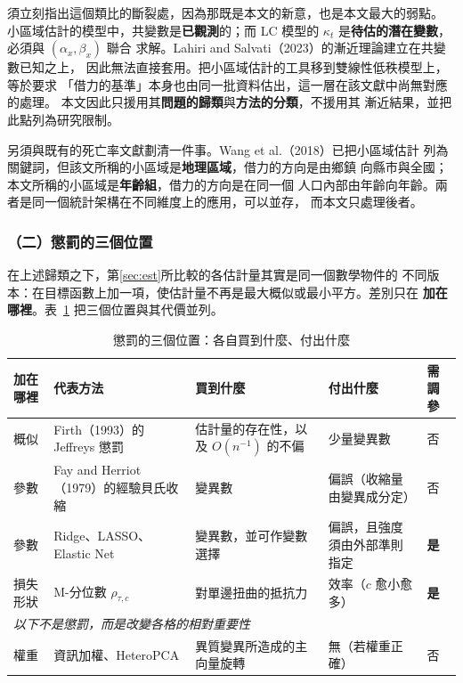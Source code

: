 \documentclass[UTF8, fontset=macnew, a4paper, 12pt]{ctexart}
\begin{document}
須立刻指出這個類比的斷裂處，因為那既是本文的新意，也是本文最大的弱點。
小區域估計的模型中，共變數是\textbf{已觀測}的；而 LC 模型的
$\kappa_t$ 是\textbf{待估的潛在變數}，必須與 $(\alpha_x,\beta_x)$ 聯合
求解。Lahiri and Salvati（2023）的漸近理論建立在共變數已知之上，
因此無法直接套用。把小區域估計的工具移到雙線性低秩模型上，等於要求
「借力的基準」本身也由同一批資料估出，這一層在該文獻中尚無對應的處理。
本文因此只援用其\textbf{問題的歸類}與\textbf{方法的分類}，不援用其
漸近結果，並把此點列為研究限制。

另須與既有的死亡率文獻劃清一件事。Wang et al.（2018）已把小區域估計
列為關鍵詞，但該文所稱的小區域是\textbf{地理區域}，借力的方向是由鄉鎮
向縣市與全國；本文所稱的小區域是\textbf{年齡組}，借力的方向是在同一個
人口內部由年齡向年齡。兩者是同一個統計架構在不同維度上的應用，可以並存，
而本文只處理後者。

\subsubsection{（二）懲罰的三個位置}

在上述歸類之下，第\ref{sec:est}所比較的各估計量其實是同一個數學物件的
不同版本：在目標函數上加一項，使估計量不再是最大概似或最小平方。差別只在
\textbf{加在哪裡}。表~\ref{tab:penpos} 把三個位置與其代價並列。

\begin{table}[H]
\centering
\caption{懲罰的三個位置：各自買到什麼、付出什麼}
\small
\renewcommand{\arraystretch}{1.2}
\begin{tabular}{p{2.1cm}p{3.0cm}p{3.1cm}p{2.9cm}p{1.5cm}}
\toprule
加在哪裡 & 代表方法 & 買到什麼 & 付出什麼 & 需調參\\
\midrule
概似 & Firth（1993）的 Jeffreys 懲罰 &
估計量的存在性，以及 $O(n^{-1})$ 的不偏 &
少量變異數 & 否\\
參數 & Fay and Herriot（1979）的經驗貝氏收縮 &
變異數 & 偏誤（收縮量由變異成分定） & 否\\
參數 & Ridge、LASSO、Elastic Net &
變異數，並可作變數選擇 & 偏誤，且強度須由外部準則指定 & \textbf{是}\\
損失形狀 & M-分位數 $\rho_{\tau,c}$ &
對單邊扭曲的抵抗力 & 效率（$c$ 愈小愈多） & \textbf{是}\\
\midrule
\multicolumn{5}{l}{\textit{以下不是懲罰，而是改變各格的相對重要性}}\\
權重 & 資訊加權、HeteroPCA &
異質變異所造成的主向量旋轉 & 無（若權重正確） & 否\\
\bottomrule
\end{tabular}
\label{tab:penpos}
\end{table}
\end{document}
